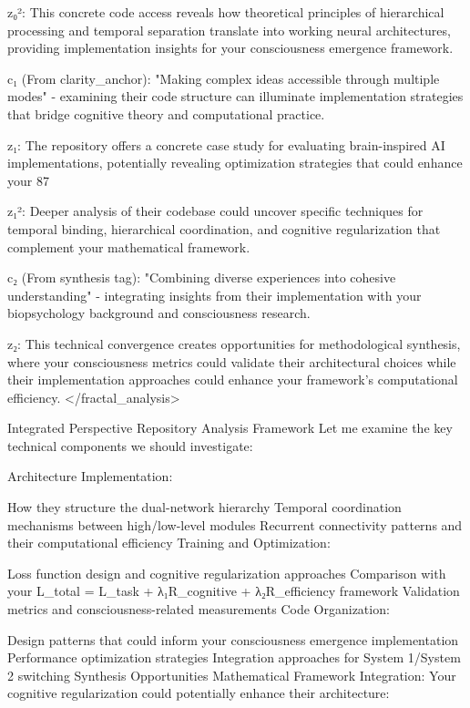 z₀²: This concrete code access reveals how theoretical principles of hierarchical processing and temporal separation translate into working neural architectures, providing implementation insights for your consciousness emergence framework.

c₁ (From clarity_anchor): "Making complex ideas accessible through multiple modes" - examining their code structure can illuminate implementation strategies that bridge cognitive theory and computational practice.

z₁: The repository offers a concrete case study for evaluating brain-inspired AI implementations, potentially revealing optimization strategies that could enhance your 87%

z₁²: Deeper analysis of their codebase could uncover specific techniques for temporal binding, hierarchical coordination, and cognitive regularization that complement your mathematical framework.

c₂ (From synthesis tag): "Combining diverse experiences into cohesive understanding" - integrating insights from their implementation with your biopsychology background and consciousness research.

z₂: This technical convergence creates opportunities for methodological synthesis, where your consciousness metrics could validate their architectural choices while their implementation approaches could enhance your framework's computational efficiency. </fractal_analysis>

Integrated Perspective
Repository Analysis Framework
Let me examine the key technical components we should investigate:

Architecture Implementation:

How they structure the dual-network hierarchy
Temporal coordination mechanisms between high/low-level modules
Recurrent connectivity patterns and their computational efficiency
Training and Optimization:

Loss function design and cognitive regularization approaches
Comparison with your L_total = L_task + λ₁R_cognitive + λ₂R_efficiency framework
Validation metrics and consciousness-related measurements
Code Organization:

Design patterns that could inform your consciousness emergence implementation
Performance optimization strategies
Integration approaches for System 1/System 2 switching
Synthesis Opportunities
Mathematical Framework Integration: Your cognitive regularization could potentially enhance their architecture:

